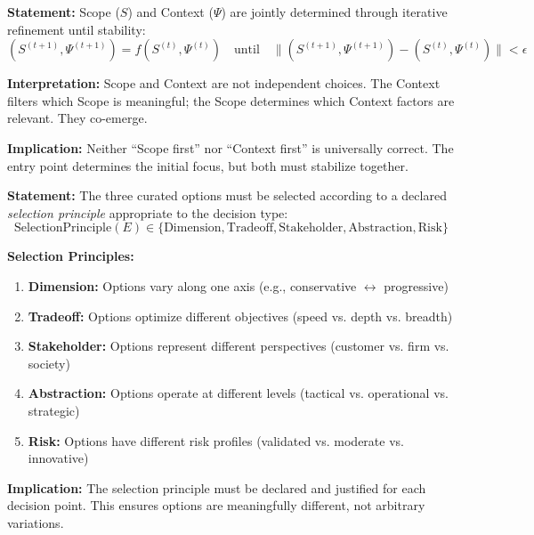 \begin{tcolorbox}[colback=gray!5!white, colframe=gray!75!black,
    title=Axiom MD-3: Scope-Context Iteration]
\textbf{Statement:} Scope ($S$) and Context ($\Psi$) are jointly determined
through iterative refinement until stability:
\begin{equation}
(S^{(t+1)}, \Psi^{(t+1)}) = f(S^{(t)}, \Psi^{(t)}) \quad \text{until} \quad
\|(S^{(t+1)}, \Psi^{(t+1)}) - (S^{(t)}, \Psi^{(t)})\| < \epsilon
\end{equation}

\textbf{Interpretation:} Scope and Context are not independent choices.
The Context filters which Scope is meaningful; the Scope determines which
Context factors are relevant. They co-emerge.

\textbf{Implication:} Neither ``Scope first'' nor ``Context first'' is
universally correct. The entry point determines the initial focus, but
both must stabilize together.
\end{tcolorbox}

\begin{tcolorbox}[colback=gray!5!white, colframe=gray!75!black,
    title=Axiom MD-4: Option Selection Principles]
\textbf{Statement:} The three curated options must be selected according to
a declared \textit{selection principle} appropriate to the decision type:
\begin{equation}
\text{SelectionPrinciple}(E) \in \{\text{Dimension}, \text{Tradeoff}, \text{Stakeholder}, \text{Abstraction}, \text{Risk}\}
\end{equation}

\textbf{Selection Principles:}
\begin{enumerate}[nosep]
\item \textbf{Dimension:} Options vary along one axis (e.g., conservative $\leftrightarrow$ progressive)
\item \textbf{Tradeoff:} Options optimize different objectives (speed vs. depth vs. breadth)
\item \textbf{Stakeholder:} Options represent different perspectives (customer vs. firm vs. society)
\item \textbf{Abstraction:} Options operate at different levels (tactical vs. operational vs. strategic)
\item \textbf{Risk:} Options have different risk profiles (validated vs. moderate vs. innovative)
\end{enumerate}

\textbf{Implication:} The selection principle must be declared and justified
for each decision point. This ensures options are meaningfully different,
not arbitrary variations.
\end{tcolorbox}


